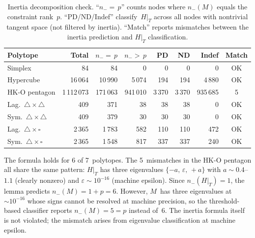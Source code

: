 \begin{table}[h]
\centering
\small
\begin{tabular}{lrrrrrrc}
\toprule
Polytope & Total & $n_- {=}\, p$ & $n_- {>}\, p$ & PD & ND & Indef & Match \\
\midrule
Simplex              &         84 &        84 &       0 &     0 &     0 &       0 & OK \\
Hypercube            &     16\,064 &    10\,990 &   5\,074 &   194 &   194 &   4\,880 & OK \\
HK-O pentagon        &  1\,112\,073 &   171\,063 & 941\,010 & 3\,370 & 3\,370 & 935\,685 & 5 \\
Lag.\ $\triangle{\times}\triangle$ &        409 &       371 &      38 &    38 &    38 &       0 & OK \\
Sym.\ $\triangle{\times}\triangle$ &        409 &       379 &      30 &    30 &    30 &       0 & OK \\
Lag.\ $\triangle{\times}\square$   &      2\,365 &     1\,783 &     582 &   110 &   110 &     472 & OK \\
Sym.\ $\triangle{\times}\square$   &      2\,365 &     1\,548 &     817 &   337 &   337 &     240 & OK \\
\bottomrule
\end{tabular}
\caption{Inertia decomposition check.
  ``$n_- {=}\, p$'' counts nodes where $n_-(M)$ equals
  the constraint rank~$p$.
  ``PD/ND/Indef'' classify~$H|_T$ across all nodes with
  nontrivial tangent space (not filtered by inertia).
  ``Match'' reports mismatches between the inertia prediction
  and $H|_T$ classification.}
\label{tab:kkt-inertia}
\end{table}

The formula holds for 6 of 7~polytopes.
The 5~mismatches in the HK-O pentagon all share the same pattern:
$H|_T$ has three eigenvalues $\{-a,\, \varepsilon,\, +a\}$
with $a \sim 0.4$--$1.1$ (clearly nonzero) and
$\varepsilon \sim 10^{-16}$ (machine epsilon).
Since $n_-(H|_T) = 1$, the lemma predicts $n_-(M) = 1 + p = 6$.
However, $M$~has three eigenvalues at ${\sim}10^{-16}$
whose signs cannot be resolved at machine precision,
so the threshold-based classifier reports $n_-(M) = 5 = p$
instead of~$6$.
The inertia formula itself is not violated;
the mismatch arises from eigenvalue classification at
machine epsilon.
